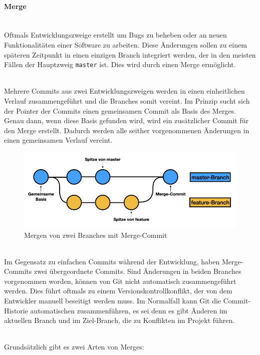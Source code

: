 \paragraph{Merge}\mbox{}\\
Oftmals Entwicklungszweige erstellt um Bugs zu beheben oder an neuen Funktionalitäten einer Software zu arbeiten. Diese Änderungen sollen zu einem späteren Zeitpunkt in einen einzigen Branch integriert werden, der in den meisten Fällen der Hauptzweig \texttt{master} ist. Dies wird durch einen Merge ermöglicht.

 \mbox{}\\
Mehrere Commits aus zwei Entwicklungszweigen werden in einen einheitlichen Verlauf zusammengeführt und die Branches somit vereint. Im Prinzip sucht sich der Pointer der Commits einen gemeinsamen Commit als Basis des Merges. Genau dann, wenn diese Basis gefunden wird, wird ein zusätzlicher Commit für den Merge erstellt. Dadurch werden alle seither vorgenommenen Änderungen in einen gemeinsamen Verlauf vereint.

\begin{figure}[H]
\begin{center}
	\includegraphics[scale=.8]{images/git-merge.png}
\end{center}
	\caption{Mergen von zwei Branches mit Merge-Commit}
\end{figure}

 \mbox{}\\
Im Gegensatz zu einfachen Commits während der Entwicklung, haben Merge-Commits zwei übergeordnete Commits. Sind Änderungen in beiden Branches vorgenommen worden, können von Git nicht automatisch zusammengeführt werden. Dies führt oftmals zu einem Versionskontrollkonflikt, der von dem Entwickler manuell beseitigt werden muss. Im Normalfall kann Git die Commit-Historie automatischen zusammenführen, es sei denn es gibt Änderen im aktuellen Branch und im Ziel-Branch, die zu Konflikten im Projekt führen.

 \mbox{}\\
Grundsätzlich gibt es zwei Arten von Merges:

